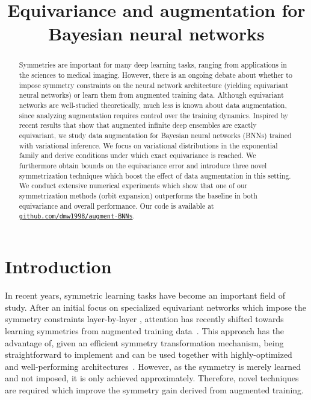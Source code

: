 \documentclass{article}
\title{Equivariance and augmentation for Bayesian neural networks}
\author{}
\begin{document}
\maketitle

\begin{abstract}
  \vspace{-0.5ex}
Symmetries are important for many deep learning tasks, ranging from applications in the sciences to medical imaging. However, there is an ongoing debate about whether to impose symmetry constraints on the neural network architecture (yielding equivariant neural networks) or learn them from augmented training data. Although equivariant networks are well-studied theoretically, much less is known about data augmentation, since analyzing augmentation requires control over the training dynamics. Inspired by recent results that show that augmented infinite deep ensembles are exactly equivariant, we study data augmentation for Bayesian neural networks (BNNs) trained with variational inference. We focus on variational distributions in the exponential family and derive conditions under which exact equivariance is reached. We furthermore obtain bounds on the equivariance error and introduce three novel symmetrization techniques which boost the effect of data augmentation in this setting. We conduct extensive numerical experiments which show that one of our symmetrization methods (orbit expansion) outperforms the baseline in both equivariance and overall performance. Our code is available at \href{https://github.com/dmw1998/augment-BNNs}{\texttt{github.com/dmw1998/augment-BNNs}}.
\end{abstract}



\section{Introduction}
In recent years, symmetric learning tasks have become an important field of study. After an initial focus on specialized equivariant networks which impose the symmetry constraints layer-by-layer \citep{bronstein2017geometric}, attention has recently shifted towards learning symmetries from augmented training data~\citep{chen2020group}. This approach has the advantage of, given an efficient symmetry transformation mechanism,  being straightforward to implement
and can be used together with highly-optimized and well-performing architectures~\citep{wang2024}. However, as the symmetry is merely learned and not imposed, it is only achieved approximately.
Therefore, novel techniques are required which improve the symmetry gain derived from augmented training.
\end{document}
